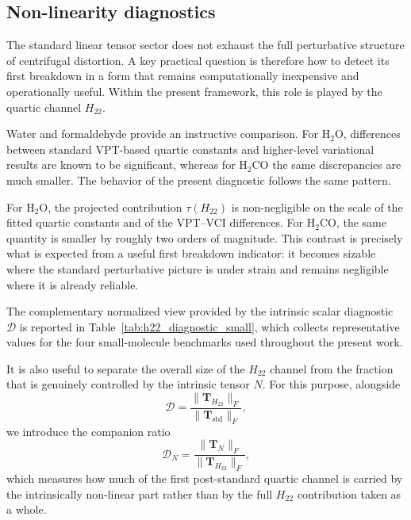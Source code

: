 \documentclass[aip,jcp,reprint,floatfix]{revtex4-2}
\begin{document}
\subsection{Non-linearity diagnostics}

The standard linear tensor sector does not exhaust the full
perturbative structure of centrifugal distortion. A key practical
question is therefore how to detect its first breakdown in a form that
remains computationally inexpensive and operationally useful. Within
the present framework, this role is played by the quartic channel
$H_{22}$.

Water and formaldehyde provide an instructive comparison. For H$_2$O,
differences between standard VPT-based quartic constants and
higher-level variational results are known to be significant, whereas
for H$_2$CO the same discrepancies are much smaller. The behavior of
the present diagnostic follows the same pattern.

For H$_2$O, the projected contribution $\tau(H_{22})$ is non-negligible
on the scale of the fitted quartic constants and of the VPT--VCI
differences. For H$_2$CO, the same quantity is smaller by roughly two
orders of magnitude. This contrast is precisely what is expected from
a useful first breakdown indicator: it becomes sizable where the
standard perturbative picture is under strain and remains negligible
where it is already reliable.

The complementary normalized view provided by the intrinsic scalar
diagnostic $\mathcal D$ is reported in
Table~\ref{tab:h22_diagnostic_small}, which collects representative
values for the four small-molecule benchmarks used throughout the
present work.

It is also useful to separate the overall size of the $H_{22}$ channel
from the fraction that is genuinely controlled by the intrinsic tensor
$N$. For this purpose, alongside
\[
\mathcal D=
\frac{\|\mathbf T_{H_{22}}\|_F}{\|\mathbf T_{\mathrm{std}}\|_F},
\]
we introduce the companion ratio
\[
\mathcal D_N=
\frac{\|\mathbf T_N\|_F}{\|\mathbf T_{H_{22}}\|_F},
\]
which measures how much of the first post-standard quartic channel is
carried by the intrinsically non-linear part rather than by the full
$H_{22}$ contribution taken as a whole.
\end{document}
